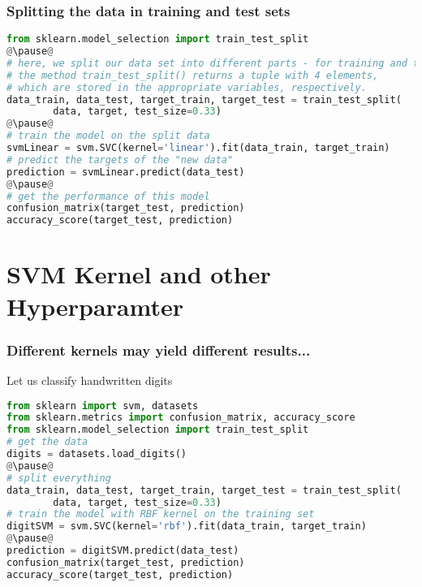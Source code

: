 \begin{frame}[c, fragile]\frametitle{Splitting the data in training and test sets}
  \begin{lstlisting}[language=Python]
from sklearn.model_selection import train_test_split
@\pause@
# here, we split our data set into different parts - for training and testing
# the method train_test_split() returns a tuple with 4 elements,
# which are stored in the appropriate variables, respectively.
data_train, data_test, target_train, target_test = train_test_split(
        data, target, test_size=0.33)
@\pause@
# train the model on the split data
svmLinear = svm.SVC(kernel='linear').fit(data_train, target_train)
# predict the targets of the "new data"
prediction = svmLinear.predict(data_test)
@\pause@
# get the performance of this model
confusion_matrix(target_test, prediction)
accuracy_score(target_test, prediction)
  \end{lstlisting}
\end{frame}

\section[Hyperparameter]{SVM Kernel and other Hyperparamter}
\begin{frame}[c, fragile]\frametitle{Different kernels may yield different results...}
\end{frame}

\begin{frame}[c, fragile]{Let us classify handwritten digits}
  \begin{lstlisting}[language=Python]
from sklearn import svm, datasets
from sklearn.metrics import confusion_matrix, accuracy_score
from sklearn.model_selection import train_test_split
# get the data
digits = datasets.load_digits()
@\pause@
# split everything
data_train, data_test, target_train, target_test = train_test_split(
        data, target, test_size=0.33)
# train the model with RBF kernel on the training set
digitSVM = svm.SVC(kernel='rbf').fit(data_train, target_train)
@\pause@
prediction = digitSVM.predict(data_test)
confusion_matrix(target_test, prediction)
accuracy_score(target_test, prediction)
  \end{lstlisting}
\end{frame}

